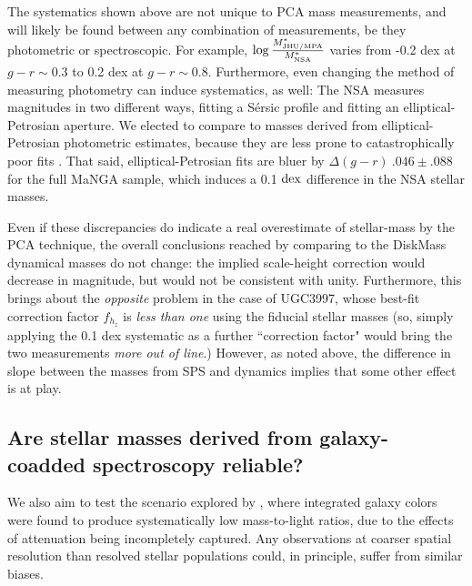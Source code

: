 The systematics shown above are not unique to PCA mass measurements, and will likely be found between any combination of measurements, be they photometric or spectroscopic. For example, $\log \frac{M^*_{\rm JHU/MPA}}{M^*_{\rm NSA}}$ varies from -0.2 dex at $g-r \sim 0.3$ to 0.2 dex at $g-r \sim 0.8$. Furthermore, even changing the method of measuring photometry can induce systematics, as well: The NSA measures magnitudes in two different ways, fitting a S\'{e}rsic profile and fitting an elliptical-Petrosian aperture. We elected to compare to masses derived from elliptical-Petrosian photometric estimates, because they are less prone to catastrophically poor fits \citep[see][for more discussion]{manga_sample_wake_17}. That said, elliptical-Petrosian fits are bluer by $\Delta (g-r) ~ .046 \pm .088$ for the full MaNGA sample, which induces a 0.1 $\rm dex$ difference in the NSA stellar masses.

Even if these discrepancies do indicate a real overestimate of stellar-mass by the PCA technique, the overall conclusions reached by comparing to the DiskMass dynamical masses do not change: the implied scale-height correction would decrease in magnitude, but would not be consistent with unity. Furthermore, this brings about the \emph{opposite} problem in the case of UGC3997, whose best-fit correction factor $f_{h_z}$ is \emph{less than one} using the fiducial stellar masses (so, simply applying the 0.1 dex systematic as a further ``correction factor" would bring the two measurements \emph{more out of line}.) However, as noted above, the difference in slope between the masses from SPS and dynamics implies that some other effect is at play.

\subsection{Are stellar masses derived from galaxy-coadded spectroscopy reliable?}
\label{chap2:subsec:resolution_effects}

We also aim to test the scenario explored by \citet{zibetti_2009}, where integrated galaxy colors were found to produce systematically low mass-to-light ratios, due to the effects of attenuation being incompletely captured. Any observations at coarser spatial resolution than resolved stellar populations could, in principle, suffer from similar biases.

